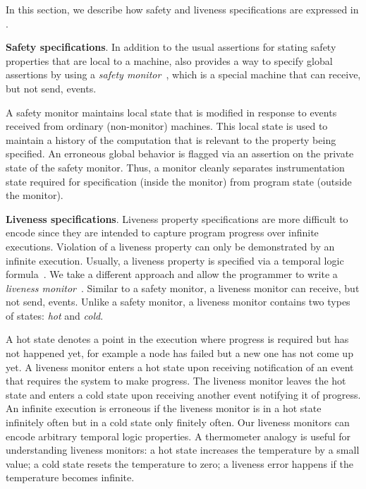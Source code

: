 In  this section, we describe how safety and liveness specifications are expressed in \psharp.

\textbf{Safety specifications}.
In addition to the usual assertions for stating safety properties that are local to a machine, \psharp also provides a way to specify global assertions by using a \emph{safety monitor}~\cite{desai2015building}, which is a special machine that can receive, but not send, events.

A safety monitor maintains local state that is modified in response to events received from ordinary (non-monitor) machines. This local state is used to maintain a history of the computation that is relevant to the property being specified. An erroneous global behavior is flagged via an assertion on the private state of the safety monitor. Thus, a \psharp monitor cleanly separates instrumentation state required for specification (inside the monitor) from program state (outside the monitor).

\textbf{Liveness specifications}.
Liveness property specifications are more difficult to encode since they are intended to capture program progress over infinite executions. Violation of a liveness property can only be demonstrated by an infinite execution. Usually, a liveness property is specified via a temporal logic formula~\cite{Pnueli1977,lamport1994temporal}. We take a different approach and allow the programmer to write a \emph{liveness monitor}~\cite{desai2015building}. Similar to a safety monitor, a liveness monitor can receive, but not send, events. Unlike a safety monitor, a liveness monitor contains two types of states: \emph{hot} and \emph{cold}.

A hot state denotes a point in the execution where progress is required but has not happened yet, for example a node has failed but a new one has not come up yet. A liveness monitor enters a hot state upon receiving notification of an event that requires the system to make progress. The liveness monitor leaves the hot state and enters a cold state upon receiving another event notifying it of progress. An infinite execution is erroneous if the liveness monitor is in a hot state infinitely often but in a cold state only finitely often. Our liveness monitors can encode arbitrary temporal logic properties. A thermometer analogy is useful for understanding liveness monitors: a hot state increases the temperature by a small value; a cold state resets the temperature to zero; a liveness error happens if the temperature becomes infinite.

